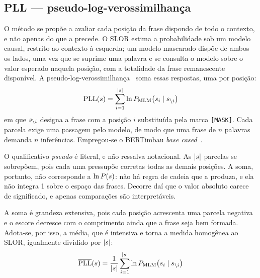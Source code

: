 \subsection{PLL --- pseudo-log-verossimilhança}
\label{met:pll}

\indent\indent O método se propõe a avaliar cada posição da frase dispondo de todo o contexto, e não apenas
do que a precede. O SLOR estima a probabilidade sob um modelo causal, restrito ao contexto à
esquerda; um modelo mascarado dispõe de ambos os lados, uma vez que se suprime uma palavra e
se consulta o modelo sobre o valor esperado naquela posição, com a totalidade da frase
remanescente disponível. A pseudo-log-verossimilhança~\cite{wang2019,salazar2020} soma essas
respostas, uma por posição:
%
\begin{equation}
\mathrm{PLL}(s) = \sum_{i=1}^{|s|} \ln P_{\mathrm{MLM}}\bigl(s_i \mid s_{\setminus i}\bigr)
\label{eq:pll}
\end{equation}
%
em que $s_{\setminus i}$ designa a frase com a posição $i$ substituída pela marca
\texttt{[MASK]}. Cada parcela exige uma passagem pelo modelo, de modo que uma frase de $n$
palavras demanda $n$ inferências. Empregou-se o BERTimbau \emph{base cased}~\cite{souza2020}.

O qualificativo \emph{pseudo} é literal, e não ressalva notacional. As $|s|$ parcelas se
sobrepõem, pois cada uma pressupõe corretas todas as demais posições. A soma, portanto, não
corresponde a $\ln P(s)$: não há regra de cadeia que a produza, e ela não integra 1 sobre
o espaço das frases. Decorre daí que o valor absoluto carece de significado, e apenas
comparações são interpretáveis.

A soma é grandeza extensiva, pois cada posição acrescenta uma parcela negativa e o escore
decresce com o comprimento ainda que a frase seja bem formada. Adota-se, por isso, a média,
que é intensiva e torna a medida homogênea ao SLOR, igualmente dividido por $|s|$:
%
\begin{equation}
\overline{\mathrm{PLL}}(s) = \frac{1}{|s|}\sum_{i=1}^{|s|} \ln P_{\mathrm{MLM}}\bigl(s_i \mid s_{\setminus i}\bigr)
\label{eq:pll-media}
\end{equation}

